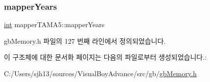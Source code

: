 \subsubsection{\texorpdfstring{mapper\+Years}{mapperYears}}
{\footnotesize\ttfamily \mbox{\hyperlink{_util_8cpp_a0ef32aa8672df19503a49fab2d0c8071}{int}} mapper\+T\+A\+M\+A5\+::mapper\+Years}



gb\+Memory.\+h 파일의 127 번째 라인에서 정의되었습니다.



이 구조체에 대한 문서화 페이지는 다음의 파일로부터 생성되었습니다.\+:\begin{DoxyCompactItemize}
\item 
C\+:/\+Users/sjh13/sources/\+Visual\+Boy\+Advance/src/gb/\mbox{\hyperlink{gb_memory_8h}{gb\+Memory.\+h}}\end{DoxyCompactItemize}
